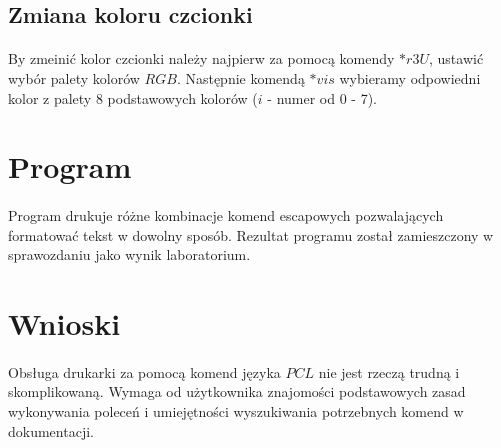 \documentclass[wide,a4paper,titlepage,12pt] {article}
\begin{document}
\subsection{Zmiana koloru czcionki}
\paragraph{}
By zmeinić kolor czcionki należy najpierw za pomocą komendy $*r3U$, ustawić wybór palety kolorów $RGB$. Następnie komendą $*vis$ wybieramy odpowiedni kolor z palety 8 podstawowych kolorów ($i$ - numer od 0 - 7).

\section{Program}
\paragraph{}
Program drukuje różne kombinacje komend escapowych pozwalających formatować tekst w dowolny sposób. Rezultat programu został zamieszczony w sprawozdaniu jako wynik laboratorium.
\lstset{ %
    language=c++,                %
    basicstyle=\scriptsize,       %
    numbers=left,                   %
    numberstyle=\scriptsize,      %
    stepnumber=10,                   %
    numbersep=9pt,                  %
    showspaces=false,               %
    showstringspaces=false,         %
    showtabs=false,                 %
    breaklines=true,                %
    }
    


\section{Wnioski}
\paragraph{}
Obsługa drukarki za pomocą komend języka $PCL$ nie jest rzeczą trudną i skomplikowaną. Wymaga od użytkownika znajomości podstawowych zasad wykonywania poleceń i umiejętności wyszukiwania potrzebnych komend w dokumentacji.
\end{document}
